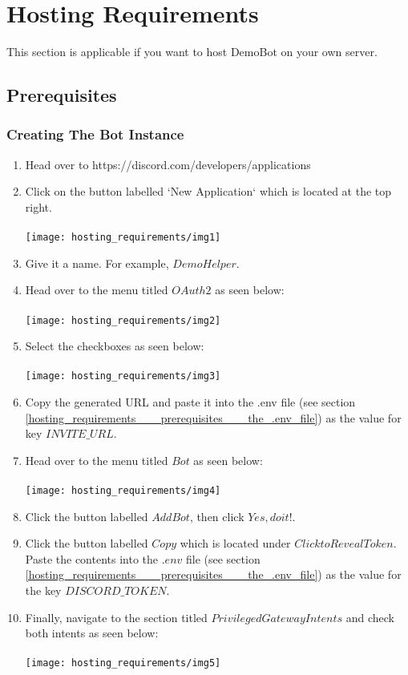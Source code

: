 
\section{Hosting Requirements}
This section is applicable if you want to host DemoBot on your own server.

\subsection{Prerequisites}

\subsubsection{Creating The Bot Instance}
\begin{enumerate}

	\item{
		Head over to https://discord.com/developers/applications
	}
	\item{
		Click on the button labelled `New Application` which is located at the top right.\\\\
		\texttt{[image: hosting\_requirements/img1]}
	}
	\item{
		Give it a name.
		For example, $DemoHelper$.
	}
	\item{
		Head over to the menu titled $OAuth2$ as seen below:\\\\
		\texttt{[image: hosting\_requirements/img2]}
	}
	\item{
		Select the checkboxes as seen below:\\\\
		\texttt{[image: hosting\_requirements/img3]}
	}
	\item{
		Copy the generated URL and paste it into the .env file (see section \ref{hosting_requirements___prerequisites___the_.env_file}) as the value for key $INVITE\_URL$.
	}
	\item{
		Head over to the menu titled $Bot$ as seen below:\\\\
		\texttt{[image: hosting\_requirements/img4]}
	}
	\item{
		Click the button labelled $Add Bot$, then click $Yes, do it!$.
	}
	\item{
		Click the button labelled $Copy$ which is located under $Click to Reveal Token$.
		Paste the contents into the $.env$ file (see section \ref{hosting_requirements___prerequisites___the_.env_file}) as the value for the key $DISCORD\_TOKEN$.
	}
	\item{
		Finally, navigate to the section titled $Privileged Gateway Intents$ and check both intents as seen below:\\\\
		\texttt{[image: hosting\_requirements/img5]}
	}

\end{enumerate}

